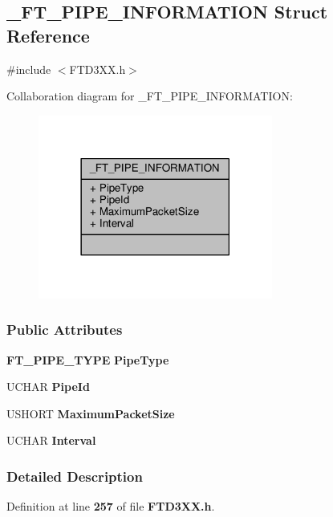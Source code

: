 \subsection{\+\_\+\+F\+T\+\_\+\+P\+I\+P\+E\+\_\+\+I\+N\+F\+O\+R\+M\+A\+T\+I\+ON Struct Reference}
\label{struct__FT__PIPE__INFORMATION}


{\ttfamily \#include $<$F\+T\+D3\+X\+X.\+h$>$}



Collaboration diagram for \+\_\+\+F\+T\+\_\+\+P\+I\+P\+E\+\_\+\+I\+N\+F\+O\+R\+M\+A\+T\+I\+ON\+:
\nopagebreak
\begin{figure}[H]
\begin{center}
\leavevmode
\includegraphics[width=218pt]{d8/d8b/struct__FT__PIPE__INFORMATION__coll__graph}
\end{center}
\end{figure}
\subsubsection*{Public Attributes}
\begin{DoxyCompactItemize}
\item 
{\bf F\+T\+\_\+\+P\+I\+P\+E\+\_\+\+T\+Y\+PE} {\bf Pipe\+Type}
\item 
U\+C\+H\+AR {\bf Pipe\+Id}
\item 
U\+S\+H\+O\+RT {\bf Maximum\+Packet\+Size}
\item 
U\+C\+H\+AR {\bf Interval}
\end{DoxyCompactItemize}


\subsubsection{Detailed Description}


Definition at line {\bf 257} of file {\bf F\+T\+D3\+X\+X.\+h}.



